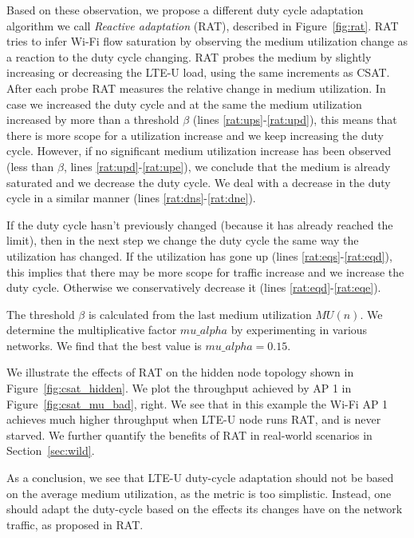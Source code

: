 Based on these observation, we propose a different duty cycle adaptation algorithm we call {\em Reactive adaptation} (RAT), described in Figure~\ref{fig:rat}. 
RAT tries to infer Wi-Fi flow saturation by observing the medium utilization change as a reaction to the duty cycle changing. 
RAT probes the medium by slightly increasing or decreasing the LTE-U load, using the same increments as CSAT. 
After each probe RAT measures the relative change in medium utilization. 
In case we increased the duty cycle and at the same the medium utilization increased by more than a threshold $\beta$ (lines \ref{rat:ups}-\ref{rat:upd}), this means that there is more scope for a utilization increase and we keep increasing the duty cycle. 
However, if no significant medium utilization increase has been observed (less than $\beta$, lines \ref{rat:upd}-\ref{rat:upe}), we conclude that the medium is already saturated and we decrease the duty cycle. 
We deal with a decrease in the duty cycle in a similar manner (lines \ref{rat:dns}-\ref{rat:dne}). 

If the duty cycle hasn't previously changed (because it has already reached the limit), then in the next step we change the duty cycle the same way the utilization has changed. 
If the utilization has gone up (lines \ref{rat:eqs}-\ref{rat:eqd}), this implies that there may be more scope for traffic increase and we increase the duty cycle. Otherwise we conservatively decrease it (lines \ref{rat:eqd}-\ref{rat:eqe}).

The threshold $\beta$ is calculated from the last medium utilization $MU(n)$. We determine the multiplicative factor $mu\_alpha$ by experimenting in various networks. We find that the best value is $mu\_alpha = 0.15$.

We illustrate the effects of RAT on the hidden node topology shown in Figure~\ref{fig:csat_hidden}. 
We plot the throughput achieved by AP 1 in Figure~\ref{fig:csat_mu_bad}, right. 
We see that in this example the Wi-Fi AP 1 achieves much higher throughput when LTE-U node runs RAT, and is never starved. 
We further quantify the benefits of RAT in real-world scenarios in Section~\ref{sec:wild}.

As a conclusion, we see that LTE-U duty-cycle adaptation should not be based on the average medium utilization, as the metric is too simplistic. Instead, one should adapt the duty-cycle based on the effects its changes have on the network traffic, as proposed in RAT.
 


